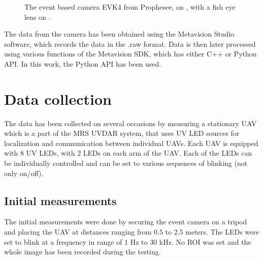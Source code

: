 \begin{figure}[htbp]
  \centering
  \caption{
The event based camera EVK4 from Prophesee, on , with a fish eye lens on .
}
  \label{fig:evk4}
\end{figure}

The data from the camera has been obtained using the Metavision Studio software, which records the data in the .raw format.
Data is then later processed using various functions of the Metavision SDK, which has either C++ or Python API. In this work,
the Python API has been used.

\section{Data collection}

The data has been collected on several occasions by measuring a stationary UAV which is a part of the MRS UVDAR system, that
uses UV \ac{LED} sources for localization and communication between individual UAVs. 
Each UAV is equipped with 8 UV LEDs, with 2 LEDs on each arm of the UAV. Each of the LEDs can be individually controlled
and can be set to various sequences of blinking (not only on/off).

\subsection{Initial measurements}

The initial measurements were done by securing the event camera on a tripod and placing the UAV at distances ranging from
$0.5$ to $2.5$ meters. The LEDs were set to blink at a frequency in range of $1$ Hz to $30$ kHz. No \ac{ROI} was set
and the whole image has been recorded during the testing.

